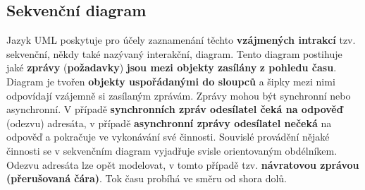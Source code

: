 \subsection{Sekvenční diagram}
Jazyk UML poskytuje pro účely zaznamenání těchto \textbf{vzájmených intrakcí} tzv. sekvenční, někdy také nazývaný interakční, diagram. Tento diagram postihuje jaké \textbf{zprávy} (\textbf{požadavky}) \textbf{jsou mezi objekty zasílány} \textbf{z pohledu času}. Diagram je tvořen \textbf{objekty uspořádanými do sloupců} a šipky mezi nimi odpovídají {vzájemně si zasílaným zprávám}. Zprávy mohou být {synchronní} nebo {asynchronní}. V případě \textbf{synchronních zpráv odesílatel čeká na odpověď} (odezvu) adresáta, v případě \textbf{asynchronní zprávy odesílatel nečeká} na odpověď a pokračuje ve vykonávání své činnosti. Souvislé provádění nějaké činnosti se v sekvenčním diagram vyjadřuje svisle orientovaným obdélníkem. Odezvu adresáta lze opět modelovat, v tomto případě tzv. \textbf{návratovou zprávou (přerušovaná čára)}. Tok času probíhá ve směru od shora dolů.
\\\\
\noindent{}